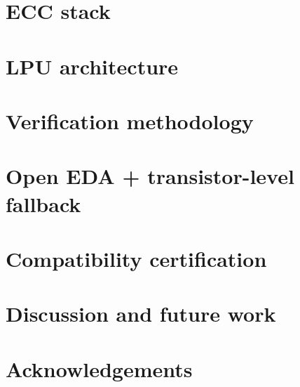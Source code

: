 \documentclass[11pt,a4paper]{article}
\begin{document}
\section{ECC stack}
\label{sec:ecc}


\section{LPU architecture}
\label{sec:lpu}


\section{Verification methodology}
\label{sec:verif}


\section{Open EDA + transistor-level fallback}
\label{sec:eda}


\section{Compatibility certification}
\label{sec:cert}


\section{Discussion and future work}
\label{sec:discussion}


\section*{Acknowledgements}


\printbibliography
\end{document}

